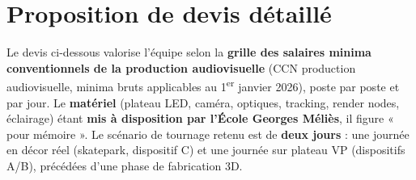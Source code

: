 \documentclass[11pt,a4paper]{report}
\begin{document}
\section{Proposition de devis détaillé}
Le devis ci-dessous valorise l'équipe selon la \textbf{grille des salaires minima conventionnels de la production audiovisuelle} (CCN production audiovisuelle, minima bruts applicables au 1\textsuperscript{er} janvier 2026), poste par poste et par jour. Le \textbf{matériel} (plateau LED, caméra, optiques, tracking, render nodes, éclairage) étant \textbf{mis à disposition par l'École Georges Méliès}, il figure « pour mémoire ». Le scénario de tournage retenu est de \textbf{deux jours} : une journée en décor réel (skatepark, dispositif C) et une journée sur plateau VP (dispositifs A/B), précédées d'une phase de fabrication 3D.
\end{document}
